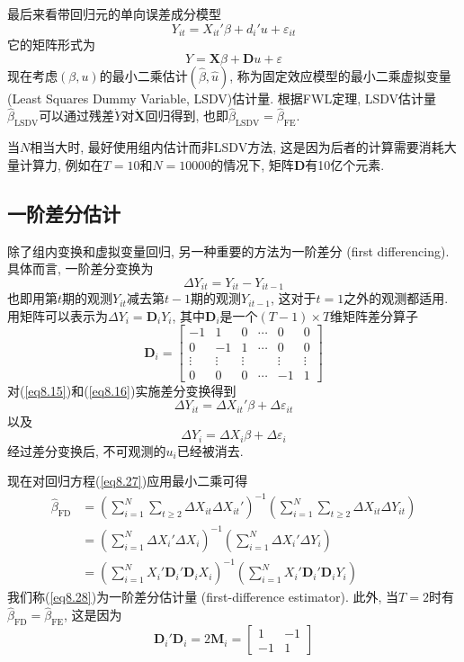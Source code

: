 \documentclass[cn, 12pt, math=mtpro2, bibstyle=apa, blue, twocol]{elegantbook}
\newcommand{\X}{\mathbold{X}}
\newcommand{\hb}{\hat{\beta}}
\begin{document}
最后来看带回归元的单向误差成分模型
$$Y_{it}=X_{it}'\beta+d_i'u+\varepsilon_{it}$$
它的矩阵形式为
$$Y=\X\beta+\mathbold{D}u+\varepsilon$$
现在考虑$(\beta,u)$的最小二乘估计$(\hb,\hat{u})$, 称为固定效应模型的最小二乘虚拟变量 (Least Squares Dummy Variable, LSDV)估计量. 根据FWL定理, LSDV估计量$\hb_{\text{LSDV}}$可以通过残差$\dot{Y}$对$\dot{\X}$回归得到, 也即$\hb_{\text{LSDV}}=\hb_{\text{FE}}$.

当$N$相当大时, 最好使用组内估计而非LSDV方法, 这是因为后者的计算需要消耗大量计算力, 例如在$T=10$和$N=10000$的情况下, 矩阵$\mathbold{D}$有10亿个元素.

\subsection{一阶差分估计}
除了组内变换和虚拟变量回归, 另一种重要的方法为一阶差分 (first differencing). 具体而言, 一阶差分变换为
$$\Delta Y_{it}=Y_{it}-Y_{it-1}$$
也即用第$t$期的观测$Y_{it}$减去第$t-1$期的观测$Y_{it-1}$, 这对于$t=1$之外的观测都适用. 用矩阵可以表示为$\Delta Y_i=\mathbold{D}_iY_i$, 其中$\mathbold{D}_i$是一个$(T-1)\times T$维矩阵差分算子
$$\mathbold{D}_i=\begin{bmatrix}
                   -1 & 1 & 0 & \cdots & 0 & 0 \\
                   0 & -1 & 1 & \cdots & 0 & 0 \\
                   \vdots & \vdots & \vdots &  & \vdots & \vdots \\
                   0 & 0 & 0 & \cdots & -1 & 1
                 \end{bmatrix}$$
对(\ref{eq8.15})和(\ref{eq8.16})实施差分变换得到
$$\Delta Y_{it}=\Delta X_{it}'\beta+\Delta \varepsilon_{it}$$
以及
\begin{equation}\label{eq8.27}
  \Delta Y_i=\Delta X_i\beta+\Delta \varepsilon_i
\end{equation}
经过差分变换后, 不可观测的$u_i$已经被消去.

现在对回归方程(\ref{eq8.27})应用最小二乘可得
\begin{align}
\hb_{\text{FD}}&=\left(\sum_{i=1}^{N}\sum_{t\geq2}\Delta X_{it}\Delta X_{it}'\right)^{-1}\left(\sum_{i=1}^{N}\sum_{t\geq2}\Delta X_{it}\Delta Y_{it}\right) \nonumber \\
&=\left(\sum_{i=1}^{N}\Delta X_i'\Delta X_i\right)^{-1}\left(\sum_{i=1}^{N}\Delta X_i'\Delta Y_i\right) \nonumber \\
&=\left(\sum_{i=1}^{N}X_i'\mathbold{D}_i'\mathbold{D}_iX_i\right)^{-1}\left(\sum_{i=1}^{N}X_i'\mathbold{D}_i'\mathbold{D}_iY_i\right) \label{eq8.28}
\end{align}
我们称(\ref{eq8.28})为一阶差分估计量 (first-difference estimator). 此外, 当$T=2$时有$\hb_{\text{FD}}=\hb_{\text{FE}}$, 这是因为
$$\mathbold{D}_i'\mathbold{D}_i=2\mathbold{M}_i=\begin{bmatrix}
                                                  1 & -1 \\
                                                  -1 & 1
                                                \end{bmatrix}$$
\end{document}
